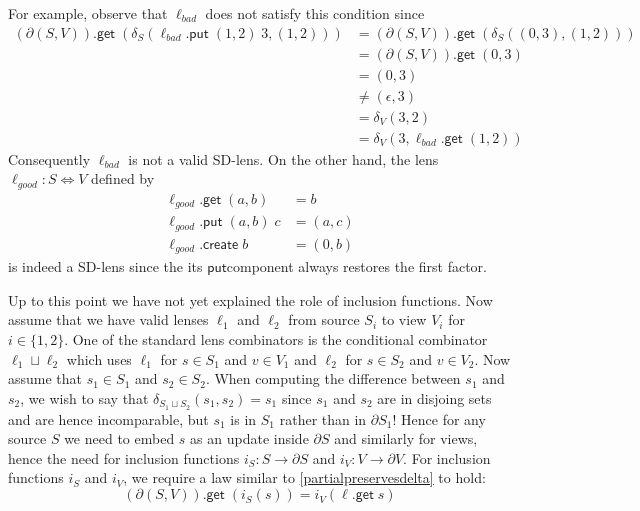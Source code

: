 \documentclass[acmsmall,review,anonymous]{acmart}\settopmatter{printfolios=true,printccs=false,printacmref=false}
\newcommand{\kw}[1]{\ensuremath{\mathsf{#1}}}
\newcommand{\get}{\ensuremath{\kw{get}}}
\newcommand{\pput}{\ensuremath{\kw{put}}}
\newcommand{\create}{\ensuremath{\kw{create}}}
\begin{document}
For example, observe that $\ell_{bad}$ does not satisfy this condition since
\begin{align}
(\partial (S, V)).\get \; (\delta_S(\ell_{bad}.\pput \; (1,2) \; 3, (1,2))) &=
(\partial (S, V)).\get \; (\delta_S((0,3), (1,2)))\\
&= (\partial (S, V)).\get \; (0,3)\\
&= (0,3)\\
&\neq (\epsilon, 3)\\
&= \delta_V(3, 2)\\
&= \delta_V(3, \ell_{bad}.\get \; (1, 2))
\end{align}
Consequently $\ell_{bad}$ is not a valid SD-lens. On the
other hand, the lens $\ell_{good} : S \Leftrightarrow V$ defined by
\begin{align*}
\ell_{good}.\get \; (a, b) &= b\\
\ell_{good}.\pput \; (a, b) \; c &= (a, c)\\
\ell_{good}.\create \; b &= (0, b)
\end{align*}
is indeed a SD-lens since the its \pput component always restores the first
factor.

Up to this point we have not yet explained the role of inclusion functions. Now
assume that we have valid lenses $\ell_1$ and $\ell_2$ from source $S_i$ to
view $V_i$ for $i \in  \{1, 2\}$. One of the standard lens combinators is the
conditional combinator $\ell_1 \sqcup \ell_2$ which uses $\ell_1$ for $s \in
S_1$ and $v \in V_1$ and $\ell_2$ for $s \in S_2$ and $v \in V_2$. Now assume
that $s_1 \in S_1$ and $s_2 \in S_2$. When computing the difference between
$s_1$ and $s_2$, we wish to say that $\delta_{S_1 \sqcup S_2}(s_1, s_2) = s_1$
since $s_1$ and $s_2$ are in disjoing sets and are hence incomparable, but $s_1$
is in $S_1$ rather than in $\partial S_1$! Hence for any source $S$ we need to
embed $s$ as an update inside $\partial S$ and similarly for views, hence the
need for inclusion functions $i_S : S \longrightarrow \partial S$ and $i_V : V
\longrightarrow \partial V$. For inclusion functions $i_S$ and $i_V$, we
require a law similar to \cref{partialpreservesdelta} to hold:
$$(\partial (S, V)).\get \; (i_{S}(s)) = i_{V}(\ell.\get \; s)$$
\end{document}

